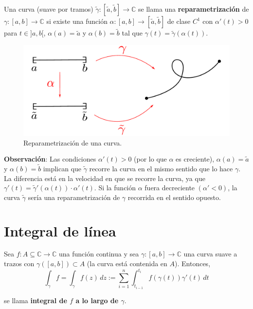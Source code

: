 \begin{defi}
Una curva (suave por tramos) $\tilde{\gamma} : [\tilde{a}, \tilde{b}] \longrightarrow \mathbb{C}$ se llama una \textbf{reparametrización} de $\gamma: [a,b] \longrightarrow \mathbb{C}$ si existe una función $\alpha: [a,b] \longrightarrow [\tilde{a}, \tilde{b}]$ de clase $C^1$ con $\alpha'(t) > 0$ para $t\in ]a,b[$, $\alpha(a) = \tilde{a}$ y $\alpha(b) = \tilde{b}$ tal que $\gamma(t) = \tilde{\gamma}(\alpha(t))$.
\end{defi}

\begin{figure}[H]
    \centering
    \includegraphics[scale = 0.5]{Figuras/Curva6.pdf}
    \caption{Reparametrización de una curva.}
    \label{fig:Curva6}
\end{figure}

\textbf{Observación}: Las condiciones $\alpha'(t) > 0$ (por lo que $\alpha$ es creciente), $\alpha(a) = \tilde{a}$ y $\alpha(b) = \tilde{b}$ implican que $\tilde{\gamma}$ recorre la curva en el mismo sentido que lo hace $\gamma$. La diferencia está en la velocidad en que se recorre la curva, ya que $\gamma'(t) = \tilde{\gamma}'(\alpha(t)) \cdot \alpha'(t)$. Si la función $\alpha$ fuera decreciente $(\alpha' <  0)$, la curva $\tilde{\gamma}$ sería una reparametrización de $\gamma$ recorrida en el sentido opuesto.

\section{Integral de línea}

\begin{defi}
Sea $f: A \subseteq \mathbb{C} \longrightarrow \mathbb{C}$ una función continua y sea $\gamma :[a,b] \longrightarrow \mathbb{C}$ una curva suave a trazos con $\gamma([a,b]) \subset A$ (la curva está contenida en $A$). Entonces,
$$\int_{\gamma} f  = \int_{\gamma} f(z)\, dz := \sum_{i=1}^n \int_{t_{i-1}}^{t_i} f(\gamma(t)) \gamma'(t) \,dt$$

se llama \textbf{integral de $f$ a lo largo de $\gamma$}.
\end{defi}


